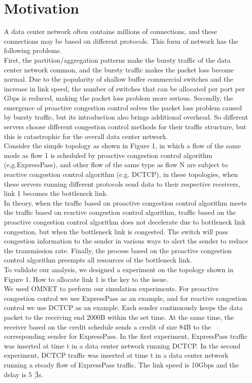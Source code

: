 \documentclass[conference]{IEEEtran}
\begin{document}
\section{Motivation}
A data center network often contains millions of connections, and these connections may be based on different protocols. This form of network has the following problems.\\
\indent First, the partition/aggregation patterns make the bursty traffic of the data center network common, and the bursty traffic makes the packet loss become normal. Due to the popularity of shallow buffer commercial switches and the increase in link speed, the number of switches that can be allocated per port per Gbps is reduced, making the packet loss problem more serious. Secondly, the emergence of proactive congestion control solves the packet loss problem caused by bursty traffic, but its introduction also brings additional overhead. So different servers choose different congestion control methods for their traffic structure, but this is catastrophic for the overall data center network.\\
\indent Consider the simple topology as shown in Figure 1, in which a flow of the same mode as flow 1 is scheduled by proactive congestion control algorithm (e,g.ExpressPass), and other flow of the same type as flow N are subject to reactive congestion control algorithm (e.g. DCTCP), in these topologies, when these servers running different protocols send data to their respective receivers, link 1 becomes the bottleneck link.\\
\indent In theory, when the traffic based on proactive congestion control algorithm meets the traffic based on reactive congestion control algorithm, traffic based on the proactive congestion control algorithm does not decelerate due to bottleneck link congestion, but when the bottleneck link is congested.  The switch will pass congestion information to the sender in various ways to alert the sender to reduce the transmission rate. Finally, the process based on the proactive congestion control algorithm preempts all resources of the bottleneck link.\\
\indent To validate our analysis, we designed a experiment on the topology shown in Figure 1. How to allocate link 1 is the key to the issue.\\
\indent We used OMNET to perform our simulation experiments. For proactive congestion control we use ExpressPass as an example, and for reactive congestion control we use DCTCP as an example. Each sender continuously keeps the data packet to the receiving end 2000B within the set time. At the same time, the receiver based on the credit schedule sends a credit of size 84B to the corresponding sender for ExpressPass. In the first experiment, ExpressPass traffic was inserted at time t in a data center network running DCTCP. In the second experiment, DCTCP traffic was inserted at time t in a data center network running a steady flow of ExpressPass traffic.     The link speed is 10Gbps and the delay is 5 ¦Ìs.\\
\end{document}
